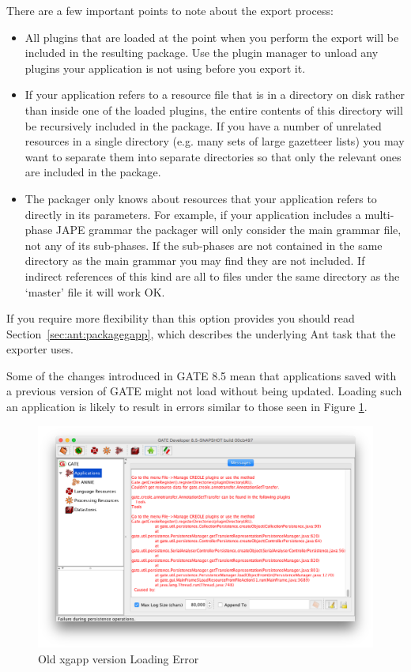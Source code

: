 There are a few important points to note about the export process:
\begin{itemize}
\item All plugins that are loaded at the point when you perform the export will
  be included in the resulting package.  Use the plugin manager to unload any
  plugins your application is not using before you export it.
\item If your application refers to a resource file that is in a directory on
  disk rather than inside one of the loaded plugins, the entire contents of
  this directory will be recursively included in the package.  If you have a
  number of unrelated resources in a single directory (e.g. many sets of large
  gazetteer lists) you may want to separate them into separate directories
  so that only the relevant ones are included in the package.
\item The packager only knows about resources that your application refers to
  directly in its parameters.  For example, if your application includes a
  multi-phase JAPE grammar the packager will only consider the main grammar
  file, not any of its sub-phases.  If the sub-phases are not contained in the
  same directory as the main grammar you may find they are not included.  If
  indirect references of this kind are all to files under the same directory as
  the `master' file it will work OK.
\end{itemize}

If you require more flexibility than this option provides you should read
Section~\ref{sec:ant:packagegapp}, which describes the underlying Ant task that
the exporter uses.

Some of the changes introduced in GATE 8.5 mean that applications saved with a previous version of GATE might not
load without being updated. Loading such an application is likely to result in errors similar to those seen in Figure \ref{fig:oldxgapp}.

\begin{figure}[htb]
\begin{center}
\includegraphics[width=\textwidth]{old-xgapp-error.png}
\end{center}
\caption{Old xgapp version Loading Error}
\label{fig:oldxgapp}
\end{figure}

